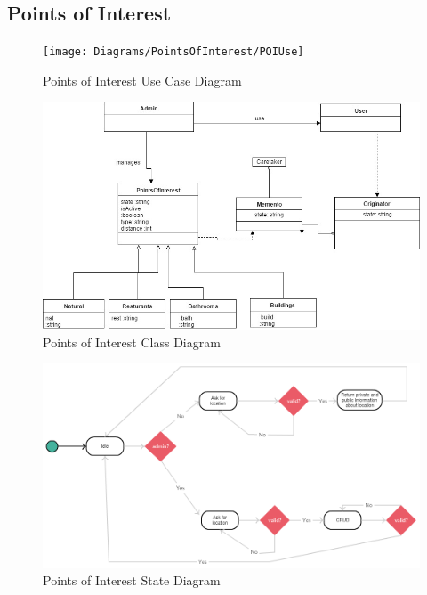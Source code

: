 \documentclass[11pt]{article}
\begin{document}
	\subsection{Points of Interest}
	\begin{figure}[!h]
        \centering
        \texttt{[image: Diagrams/PointsOfInterest/POIUse]}
        \caption{Points of Interest Use Case Diagram}
        \label{fig:poi_use_case}
    \end{figure}
    \begin{figure}[!h]
        \centering
        \includegraphics[width=\textwidth]{Diagrams/PointsOfInterest/POIClass}
        \caption{Points of Interest Class Diagram}
        \label{fig:poi_class}
    \end{figure}
        \begin{figure}[!h]
        \centering
        \includegraphics[width=\textwidth]{Diagrams/PointsOfInterest/POIState}
        \caption{Points of Interest State Diagram}
        \label{fig:poi_state}
    \end{figure}
\end{document}
